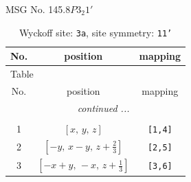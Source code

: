 \documentclass[fleqn,8pt]{jsarticle}
\begin{document}
\setcounter{MaxMatrixCols}{32}

\renewcommand{\tablename}{Table~}
\renewcommand{\figurename}{Figure~}
\begin{center}
\LARGE
MSG No. 145.8\quad$P3_{2}1'$
\end{center}
\renewcommand{\arraystretch}{1.2}
\begin{longtable}{ccc}
\caption{Wyckoff site: {\tt 3a}, site symmetry: {\tt 11'}}
 \\
 \hline \hline
No. & position & mapping \\ \hline \endfirsthead

\multicolumn{2}{l}{\tablename\ \thetable{}} \\
 \hline \hline
No. & position & mapping \\ \hline \endhead

 \hline \hline
\multicolumn{2}{r}{\footnotesize\it continued ...} \\ \endfoot

 \hline \hline
\multicolumn{2}{r}{} \\ \endlastfoot

1 & $\left[ x,\, y,\, z \right]$ & {\tt [1,4]} \\ \hline
2 & $\left[ - y,\, x - y,\, z + \frac{2}{3} \right]$ & {\tt [2,5]} \\ \hline
3 & $\left[ - x + y,\, - x,\, z + \frac{1}{3} \right]$ & {\tt [3,6]} \\
\end{longtable}
\end{document}
